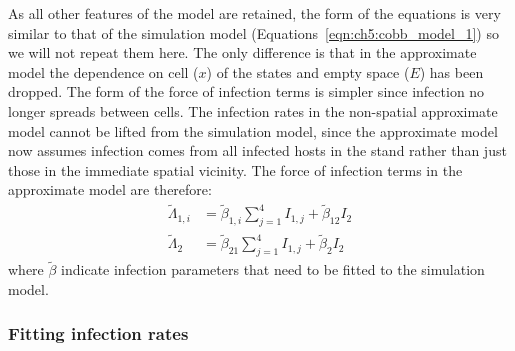 As all other features of the model are retained, the form of the equations is very similar to that of the simulation model (Equations~\ref{eqn:ch5:cobb_model_1}) so we will not repeat them here. The only difference is that in the approximate model the dependence on cell ($x$) of the states and empty space ($E$) has been dropped. The form of the force of infection terms is simpler since infection no longer spreads between cells. The infection rates in the non-spatial approximate model cannot be lifted from the simulation model, since the approximate model now assumes infection comes from all infected hosts in the stand rather than just those in the immediate spatial vicinity. The force of infection terms in the approximate model are therefore:
\begin{subequations}\label{eqn:ch6:infection_approx}
        \begin{align}
            \tilde{\Lambda}_{1,i} &= \tilde{\beta}_{1,i}\sum_{j=1}^4I_{1,j} + \tilde{\beta}_{12}I_{2} \\
            \tilde{\Lambda}_{2} &= \tilde{\beta}_{21}\sum_{j=1}^4I_{1,j} + \tilde{\beta}_{2}I_{2}
        \end{align}
\end{subequations}
where $\tilde{\beta}$ indicate infection parameters that need to be fitted to the simulation model.

\subsubsection{Fitting infection rates}


